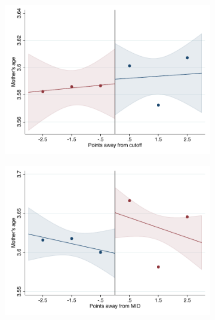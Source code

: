 \documentclass[oneside,11pt]{article}
\begin{document}
\begin{figure}[H]

    \ContinuedFloat
    \caption{(Continued) RD plots for balance variables across those assigned to IPN high-school, and those who are not\label{fig:Balance_rd_plot_IPN_3}}
    \begin{center}

    \begin{subfigure}{0.475\textwidth}
        \centering
        \includegraphics[width=\textwidth]{04_Figures/rd_plot_tau_edad_mad_IPN3.pdf}
    \end{subfigure}
    \begin{subfigure}{0.475\textwidth}
        \centering
        \includegraphics[width=\textwidth]{04_Figures/rd_plot_mid_edad_mad_IPN3.pdf}
    \end{subfigure}
    \end{center}
    

\end{figure}
\end{document}
